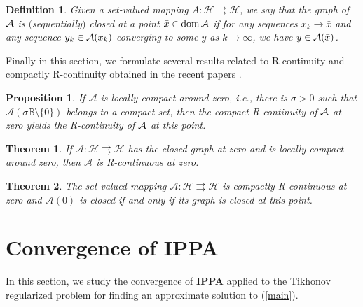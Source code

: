 \documentclass[12pt]{article}
\newcommand{\ball}{\mathbb{B}}
\theoremstyle{plain}
\newtheorem{definition}{Definition}
\newtheorem{theorem}{Theorem}
\newtheorem{proposition}{Proposition}
\newcommand\dom{{\rm dom}}%
\begin{document}
\begin{definition}\label{closed graph} Given a set-valued mapping $A:\mathcal{H} \rightrightarrows \mathcal{H}$, we say that the {\sc graph} of ${\cal A}$ is $($sequentially$)$  {\sc closed at a  point} $\bar x\in\dom\,{\cal A}$ if for any sequences $x_k\to\bar x$ and any sequence $y_k\in{\cal A}(x_k)$ converging to some $y$ as $k\to\infty$, we have $y\in{\cal A}(\bar x)$.
\end{definition}

Finally in this section, we formulate several {results} related to R-continuity and compactly R-continuity obtained in the recent papers \cite{LMT,LT}.

\begin{proposition}\label{localc}{\rm\cite{LMT}}
If $\mathcal{A}$ is locally compact around  zero, i.e.,  there is $\sigma>0$ such that {$\mathcal{A}( \sigma \ball\setminus \{0\})$} belongs to a compact set, then the compact R-continuity of ${\cal A}$ at zero yields the R-continuity  {of ${\cal A}$} at  this point.
\end{proposition}

\begin{theorem}\label{compact}{\rm\cite{LT}}
If $\mathcal{A}:  \mathcal{H}\rightrightarrows \mathcal{H}$ has the closed graph  at zero and is  locally compact  around zero, then $\mathcal{A}$ is R-continuous at zero.
\end{theorem}

\begin{theorem}\label{compact1}{\rm\cite{LMT}}
The set-valued mapping $\mathcal{A}:\mathcal{H}\rightrightarrows \mathcal{H}$ is compactly R-continuous at zero {and $\mathcal{A}(0)$ is closed} if and only if its graph is closed at this point.
\end{theorem}

\section{Convergence of \textbf{IPPA}}\label{s3}

In this section, we study the convergence of \textbf{IPPA} applied to  the Tikhonov regularized problem for finding an approximate solution to (\ref{main}).
\end{document}
